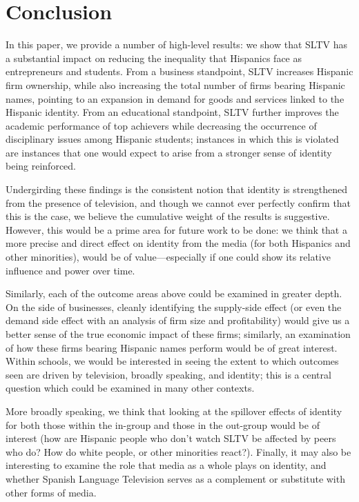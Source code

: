 \documentclass[11pt]{article}
\begin{document}
\section{Conclusion} \label{s:conclusion}

In this paper, we provide a number of high-level results: we show that SLTV has a substantial impact on reducing the inequality that Hispanics face as entrepreneurs and students. From a business standpoint, SLTV increases Hispanic firm ownership, while also increasing the total number of firms bearing Hispanic names, pointing to an expansion in demand for goods and services linked to the Hispanic identity. From an educational standpoint, SLTV further improves the academic performance of top achievers while decreasing the occurrence of disciplinary issues among Hispanic students; instances in which this is violated are instances that one would expect to arise from a stronger sense of identity being reinforced. 

Undergirding these findings is the consistent notion that identity is strengthened from the presence of television, and though we cannot ever perfectly confirm that this is the case, we believe the cumulative weight of the results is suggestive. However, this would be a prime area for future work to be done: we think that a more precise and direct effect on identity from the media (for both Hispanics and other minorities), would be of value---especially if one could show its relative influence and power over time.

Similarly, each of the outcome areas above could be examined in greater depth. On the side of businesses, cleanly identifying the supply-side effect (or even the demand side effect with an analysis of firm size and profitability) would give us a better sense of the true economic impact of these firms; similarly, an examination of how these firms bearing Hispanic names perform would be of great interest. Within schools, we would be interested in seeing the extent to which outcomes seen are driven by television, broadly speaking, and identity; this is a central question which could be examined in many other contexts. 

More broadly speaking, we think that looking at the spillover effects of identity for both those within the in-group and those in the out-group would be of interest (how are Hispanic people who don't watch SLTV be affected by peers who do? How do white people, or other minorities react?). Finally, it may also be interesting to examine the role that media as a whole plays on identity, and whether Spanish Language Television serves as a complement or substitute with other forms of media.
\end{document}
